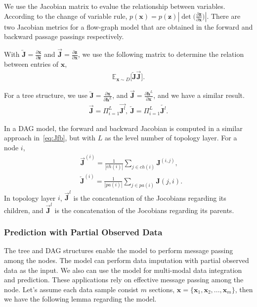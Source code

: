 \documentclass[conference]{IEEEtran}
\begin{document}
We use the Jacobian matrix to evalue the relationship between variables. According to the change of variable rule, $p(\mathbf{x}) = p(\mathbf{z})|\det\big(\frac{\partial \mathbf{z}}{\partial \mathbf{x}}\big)|$. There are two Jacobian metrics for a flow-graph model that are obtained in the forward and backward passage passings respectively.  

With $\overleftarrow{\mathbf{J}} = \frac{\partial \mathbf{x}}{\partial \mathbf{z}}$ and  $\overrightarrow{\mathbf{J}} = \frac{\partial \mathbf{z}}{\partial \mathbf{x}}$, we use the following matrix to determine the relation between entries of $\mathbf{x}$,
\begin{align*}
\mathbb{E}_{\mathbf{x} \sim D} \big[
\overleftarrow{\mathbf{J}}
\overrightarrow{\mathbf{J}}  \big] .
\end{align*}

For a tree structure, we use $\overleftarrow{\mathbf{J}}= \frac{\partial \mathbf{x}}{\partial \mathbf{h}^{L}}$, and $\overrightarrow{\mathbf{J}}  = \frac{\partial  \mathbf{h}^{L} }{\partial \mathbf{x} }$, and we have a similar result.
\begin{align} \label{eq:Jfb}
\overrightarrow{\mathbf{J}} = \Pi_{i=1}^L\overrightarrow{\mathbf{J}^l} , \ 
\overleftarrow{\mathbf{J}} = \Pi_{i=1}^L\overleftarrow{\mathbf{J}^l}  .
\end{align}

In a DAG model, the forward and backward Jacobian is computed in a similar approach in~\eqref{eq:Jfb}, but with $L$ as the level number of topology layer. For a node  $i$,
\begin{align*}
&  \overrightarrow{\mathbf{J}}^{(i)} = \frac{1}{|ch(i)|} \sum_{j \in ch(i) } \mathbf{J}^{(i,j)}, \\ &\overleftarrow{\mathbf{J}}^{(i)} = \frac{1}{|pa(i)|} \sum_{j \in pa(i) } \mathbf{J}{(j,i)} .
\end{align*} 
In topology layer $i$, $ \overrightarrow{\mathbf{J}}^{l}$ is the concatenation of the Jocobians regarding its children, and  $ \overrightarrow{\mathbf{J}}^{l}$ is the concatenation of the Jocobians regarding its parents. 


\subsubsection{Prediction with Partial Observed Data}

The tree and DAG structures enable the model to perform message passing  among the nodes. The model can perform data imputation with partial observed data as the input. We also can use the model for multi-modal data integration and prediction.  These applications rely on effective message passing among the node. Let's assume each data sample consist $m$ sections, $\mathbf{x} = \{ \mathbf{x}_1,  \mathbf{x}_2, ..., \mathbf{x}_m \}$, then we have the following lemma regarding the model.
\end{document}
